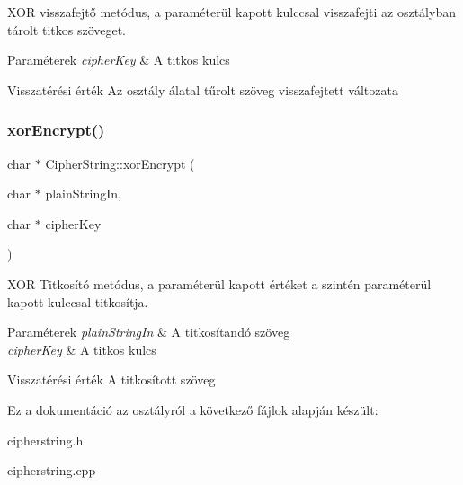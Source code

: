 X\+OR visszafejtő metódus, a paraméterül kapott kulccsal visszafejti az osztályban tárolt titkos szöveget.


\begin{DoxyParams}{Paraméterek}
{\em cipher\+Key} & A titkos kulcs \\
\hline
\end{DoxyParams}
\begin{DoxyReturn}{Visszatérési érték}
Az osztály álatal tűrolt szöveg visszafejtett változata 
\end{DoxyReturn}
\mbox{\label{class_cipher_string_abb9c46f5902c8d3cf58f1adbbe571e58}} 
\subsubsection{\texorpdfstring{xor\+Encrypt()}{xorEncrypt()}}
{\footnotesize\ttfamily char $\ast$ Cipher\+String\+::xor\+Encrypt (\begin{DoxyParamCaption}\item[{char $\ast$}]{plain\+String\+In,  }\item[{char $\ast$}]{cipher\+Key }\end{DoxyParamCaption})}

X\+OR Titkosító metódus, a paraméterül kapott értéket a szintén paraméterül kapott kulccsal titkosítja.


\begin{DoxyParams}{Paraméterek}
{\em plain\+String\+In} & A titkosítandó szöveg \\
\hline
{\em cipher\+Key} & A titkos kulcs \\
\hline
\end{DoxyParams}
\begin{DoxyReturn}{Visszatérési érték}
A titkosított szöveg 
\end{DoxyReturn}


Ez a dokumentáció az osztályról a következő fájlok alapján készült\+:\begin{DoxyCompactItemize}
\item 
cipherstring.\+h\item 
cipherstring.\+cpp\end{DoxyCompactItemize}
